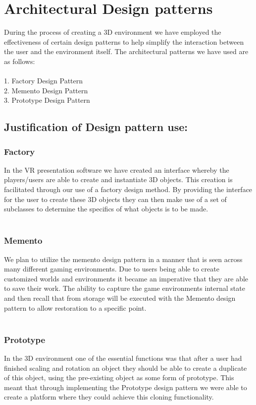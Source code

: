 \documentclass{article}
\begin{document}
  \section{Architectural Design patterns}
    During the process of creating a 3D environment we have employed the effectiveness of certain design patterns to help simplify the interaction between the user and the environment itself. The architectural patterns we have used are as follows:\\\\
    1.	Factory Design Pattern\\
    2.	Memento Design Pattern\\
    3.	Prototype Design Pattern\\
  	\subsection{Justification of Design pattern use:}
  	\subsubsection{Factory}
  	In the VR presentation software we have created an interface whereby the players/users are able to create and instantiate 3D objects. This creation is facilitated through our use of a factory design method. By providing the interface for the user to create these 3D objects they can then make use of a set of subclasses to determine the specifics of what objects is to be made.\\\\
  	\subsubsection{Memento}
  	We plan to utilize the memento design pattern in a manner that is seen across many different gaming environments. Due to users being able to create customized worlds and environments it became an imperative that they are able to save their work. The ability to capture the game environments internal state and then recall that from storage will be executed with the Memento design pattern to allow restoration to a specific point.\\\\
  	\subsubsection{Prototype}
  	In the 3D environment one of the essential functions was that after a user had finished scaling and rotation an object they should be able to create a duplicate of this object, using the pre-existing object as some form of prototype. This meant that through implementing the Prototype design pattern we were able to create a platform where they could achieve this cloning functionality.
\end{document}
